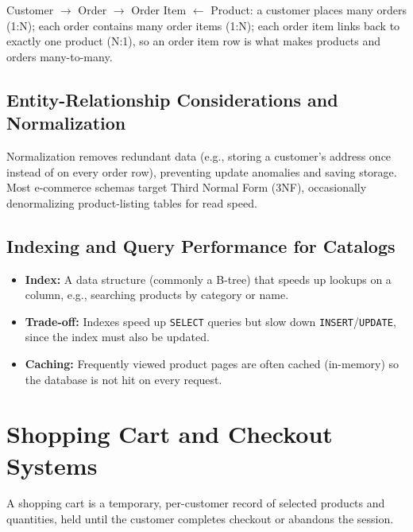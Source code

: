\documentclass[11pt,a4paper]{article}
\begin{document}
\begin{conceptbox}
Customer $\to$ Order $\to$ Order Item $\leftarrow$ Product: a customer places many orders (1:N); each order contains many order items (1:N); each order item links back to exactly one product (N:1), so an order item row is what makes products and orders many-to-many.
\end{conceptbox}

\subsection{Entity-Relationship Considerations and Normalization}
\begin{conceptbox}
Normalization removes redundant data (e.g., storing a customer's address once instead of on every order row), preventing update anomalies and saving storage. Most e-commerce schemas target Third Normal Form (3NF), occasionally denormalizing product-listing tables for read speed.
\end{conceptbox}

\subsection{Indexing and Query Performance for Catalogs}
\begin{itemize}[leftmargin=*]
  \item \textbf{Index:} A data structure (commonly a B-tree) that speeds up lookups on a column, e.g., searching products by category or name.
  \item \textbf{Trade-off:} Indexes speed up \texttt{SELECT} queries but slow down \texttt{INSERT}/\texttt{UPDATE}, since the index must also be updated.
  \item \textbf{Caching:} Frequently viewed product pages are often cached (in-memory) so the database is not hit on every request.
\end{itemize}

\section{Shopping Cart and Checkout Systems}

\begin{definitionbox}
A shopping cart is a temporary, per-customer record of selected products and quantities, held until the customer completes checkout or abandons the session.
\end{definitionbox}
\end{document}
